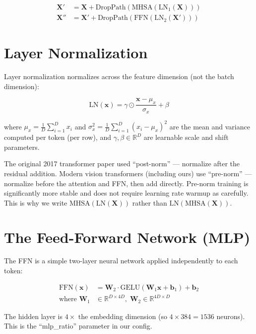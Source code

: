 \documentclass[12pt, a4paper]{report}
\newcommand{\R}{\mathbb{R}}
\newcommand{\mat}[1]{\mathbf{#1}}
\newcommand{\vect}[1]{\bm{#1}}
\begin{document}
\begin{align}
\mat{X}' &= \mat{X} + \text{DropPath}\left(\text{MHSA}(\text{LN}_1(\mat{X}))\right) \\
\mat{X}'' &= \mat{X}' + \text{DropPath}\left(\text{FFN}(\text{LN}_2(\mat{X}'))\right)
\end{align}

\section{Layer Normalization}

Layer normalization normalizes across the feature dimension (not the batch dimension):

\begin{equation}
\text{LN}(\vect{x}) = \gamma \odot \frac{\vect{x} - \mu_x}{\sigma_x} + \beta
\end{equation}

where $\mu_x = \frac{1}{D}\sum_{i=1}^D x_i$ and $\sigma_x^2 = \frac{1}{D}\sum_{i=1}^D (x_i - \mu_x)^2$ are the mean and variance computed per token (per row), and $\gamma, \beta \in \R^D$ are learnable scale and shift parameters.

\begin{conceptbox}
The original 2017 transformer paper used ``post-norm'' — normalize after the residual addition. Modern vision transformers (including ours) use ``pre-norm'' — normalize before the attention and FFN, then add directly. Pre-norm training is significantly more stable and does not require learning rate warmup as carefully. This is why we write $\text{MHSA}(\text{LN}(\mat{X}))$ rather than $\text{LN}(\text{MHSA}(\mat{X}))$.
\end{conceptbox}

\section{The Feed-Forward Network (MLP)}

The FFN is a simple two-layer neural network applied independently to each token:

\begin{align}
\text{FFN}(\vect{x}) &= \mat{W}_2 \cdot \text{GELU}(\mat{W}_1 \vect{x} + \vect{b}_1) + \vect{b}_2 \\
\text{where } \mat{W}_1 &\in \R^{D \times 4D},\; \mat{W}_2 \in \R^{4D \times D}
\end{align}

The hidden layer is $4 \times$ the embedding dimension (so $4 \times 384 = 1536$ neurons). This is the ``mlp\_ratio'' parameter in our config.
\end{document}
